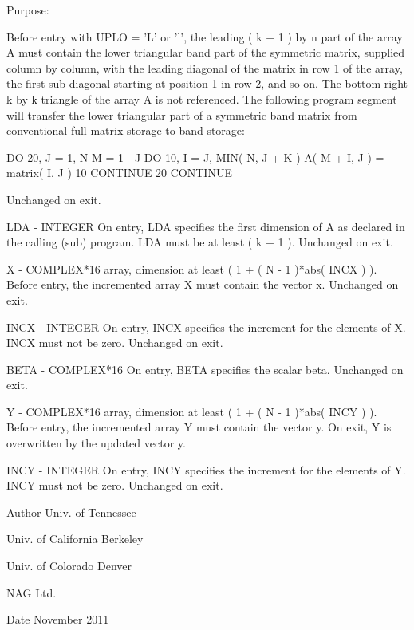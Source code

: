 \begin{DoxyParagraph}{Purpose\+: }
\begin{DoxyVerb}
           Before entry with UPLO = 'L' or 'l', the leading ( k + 1 )
           by n part of the array A must contain the lower triangular
           band part of the symmetric matrix, supplied column by
           column, with the leading diagonal of the matrix in row 1 of
           the array, the first sub-diagonal starting at position 1 in
           row 2, and so on. The bottom right k by k triangle of the
           array A is not referenced.
           The following program segment will transfer the lower
           triangular part of a symmetric band matrix from conventional
           full matrix storage to band storage:

                 DO 20, J = 1, N
                    M = 1 - J
                    DO 10, I = J, MIN( N, J + K )
                       A( M + I, J ) = matrix( I, J )
              10    CONTINUE
              20 CONTINUE

           Unchanged on exit.

  LDA    - INTEGER
           On entry, LDA specifies the first dimension of A as declared
           in the calling (sub) program. LDA must be at least
           ( k + 1 ).
           Unchanged on exit.

  X      - COMPLEX*16 array, dimension at least
           ( 1 + ( N - 1 )*abs( INCX ) ).
           Before entry, the incremented array X must contain the
           vector x.
           Unchanged on exit.

  INCX   - INTEGER
           On entry, INCX specifies the increment for the elements of
           X. INCX must not be zero.
           Unchanged on exit.

  BETA   - COMPLEX*16
           On entry, BETA specifies the scalar beta.
           Unchanged on exit.

  Y      - COMPLEX*16 array, dimension at least
           ( 1 + ( N - 1 )*abs( INCY ) ).
           Before entry, the incremented array Y must contain the
           vector y. On exit, Y is overwritten by the updated vector y.

  INCY   - INTEGER
           On entry, INCY specifies the increment for the elements of
           Y. INCY must not be zero.
           Unchanged on exit.\end{DoxyVerb}
 
\end{DoxyParagraph}
\begin{DoxyAuthor}{Author}
Univ. of Tennessee 

Univ. of California Berkeley 

Univ. of Colorado Denver 

N\+A\+G Ltd. 
\end{DoxyAuthor}
\begin{DoxyDate}{Date}
November 2011 
\end{DoxyDate}
\hypertarget{group__complex16__eig_ga96a59c0d9bd47e0ed39035f813b7b684}{}
